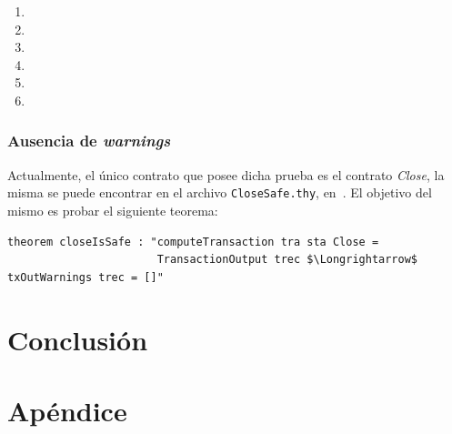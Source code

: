 \documentclass[12pt]{book}
\begin{document}
\begin{enumerate}
    \item
    \item
    \item
    \item
    \item
    \item
\end{enumerate}


\subsection{Ausencia de \textit{warnings}}

Actualmente, el único contrato que posee dicha prueba es el contrato \textit{Close}, la misma se puede encontrar en el archivo \texttt{CloseSafe.thy}, en~\cite{marlowe-isabelle-repo}. El objetivo del mismo es probar el siguiente teorema:

\begin{lstlisting}[style=Isabelle, caption=Ausencia de \textit{warnings} para el contrato \texttt{Close} en sintaxis de Isabelle/HOL.]
theorem closeIsSafe : "computeTransaction tra sta Close = 
                       TransactionOutput trec $\Longrightarrow$ txOutWarnings trec = []"
\end{lstlisting}





\chapter{Conclusión}



\chapter{Apéndice}





\end{document}
